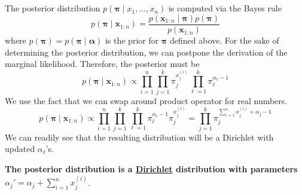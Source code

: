 \documentclass{article}
\numberwithin{equation}{section}
\begin{document}
\subsection{}
The posterior distribution $p( \bm{ \pi} \mid x_1 , \dots , x_n) $ is computed via 
the Bayes rule
\[
        p(\bm{ \pi} \mid \mathbf{x}_{1:n}) = 
        \frac{p(\mathbf{x}_{1:n} \mid \bm{ \pi} ) p(\bm{ \pi}) }{p(\mathbf{x}_{1:n})}
\]
where $p(\bm{ \pi} ) = p(\bm{ \pi} \mid \bm{\alpha} )$ is the prior for $\bm{ \pi} $
defined above. For the sake of determining the 
posterior distribution, we can postpone the derivation of the marginal likelihood.
Therefore, the posterior must be
\[
        p(\bm{ \pi} \mid \mathbf{x}_{1:n} ) \propto 
        \prod_{i = 1}^n \prod_{j=1}^k \pi_j^{x_j^{(i)}}
                \prod_{\ell = 1}^k \pi_\ell^{\alpha_\ell -1}
\] 
We use the fact that we can swap around product operator for real numbers.
\[
         p(\bm{ \pi} \mid \mathbf{x}_{1:n} ) \propto 
        \prod_{i = 1}^n \prod_{j=1}^k 
                      \prod_{\ell = 1}^k \pi_\ell^{\alpha_\ell -1}\pi_j^{x_j^{(i)}}
                      = \prod_{j = 1}^k \pi_j^{\sum_{i = 1}^n x_j^{(i)} + \alpha_j -1}

\]
We can readily see that the resulting distribution will be a Dirichlet with 
updated $\alpha_\ell$'s. 

\textbf{The posterior distribution is a \underline{Dirichlet} distribution with parameters 
$\alpha_j'= \alpha_j + \sum_{i = 1}^n x_j^{(i)} $}.
\end{document}
